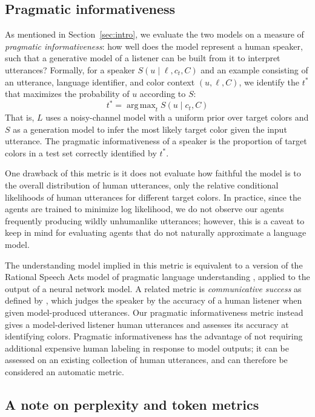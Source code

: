 \documentclass[11pt,a4paper]{article}
\renewcommand{\|}{\mid}
\DeclareMathOperator*{\argmax}{arg\,max}
\newcommand{\secref}[1]{Section~\ref{#1}}
\begin{document}
\subsection{Pragmatic informativeness} \label{sec:metric}

As mentioned in \secref{sec:intro}, we evaluate the two models on a measure of \emph{pragmatic informativeness}: how well does
the model represent a human speaker, such that a generative model of a listener can be built from it to interpret utterances?
Formally, for a speaker $S(u \| \ell, c_t, C)$ and an example consisting of an utterance, language identifier, and
color context $(u, \ell, C)$, we identify the $t^*$ that maximizes the probability of $u$ according to $S$:
\[t^* = \argmax_t S(u \| c_t, C)\]
That is, $L$ uses a noisy-channel model with a uniform prior over target colors and $S$ as a generation model to infer the most likely target color given the input utterance. The pragmatic informativeness of a speaker is the proportion of target colors in a test set correctly identified by $t^*$.

One drawback of this metric is it does not evaluate how faithful the model is to the overall distribution of human utterances, only the relative conditional likelihoods of human utterances for different target colors. In practice, since the agents are trained to minimize log likelihood, we do not observe our agents frequently producing wildly unhumanlike utterances; however, this is a caveat to keep in mind for evaluating agents that do not naturally approximate a language model.

The understanding model implied in this metric is equivalent to a version of the Rational Speech Acts model of pragmatic language understanding \cite{Frank2012,GoodmanFrank16_RSATiCS}, applied to the output of a neural network model. A related metric is \emph{communicative success} as defined by \citet{Golland2010}, which judges the speaker by the accuracy of a human listener when given model-produced utterances. Our pragmatic informativeness metric instead gives a model-derived listener human utterances and assesses its accuracy at identifying colors. Pragmatic informativeness has the advantage of not requiring additional expensive human labeling in response to model outputs; it can be assessed on an existing collection of human utterances, and can therefore be considered an automatic metric.

\subsection{A note on perplexity and token metrics}
\end{document}
